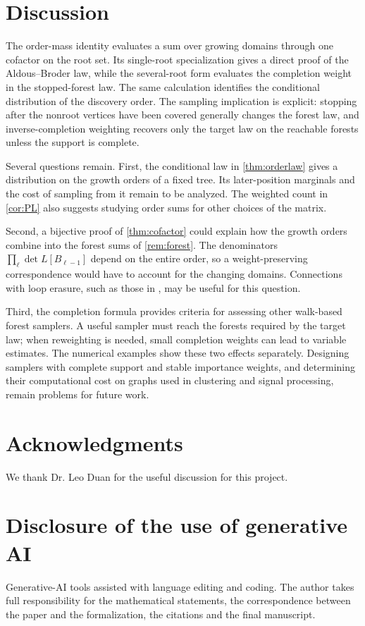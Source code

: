 \documentclass[onefignum,onetabnum]{siamart250211}
\numberwithin{theorem}{section}
\numberwithin{equation}{section}
\begin{document}
\section{Discussion}\label{sec:discussion}

The order-mass identity evaluates a sum over growing domains through
one cofactor on the root set. Its single-root specialization gives a
direct proof of the Aldous--Broder law, while the several-root form
evaluates the completion weight in the stopped-forest law. The same
calculation identifies the conditional distribution of the discovery
order. The sampling implication is explicit: stopping after the
nonroot vertices have been covered generally changes the forest law,
and inverse-completion weighting recovers only the target law on the
reachable forests unless the support is complete.

Several questions remain. First, the conditional law in
\cref{thm:orderlaw} gives a distribution on the growth orders of a
fixed tree. Its later-position marginals and the cost of sampling
from it remain to be analyzed. The weighted count in \cref{cor:PL}
also suggests studying order sums for other choices of the matrix.

Second, a bijective proof of \cref{thm:cofactor} could explain how
the growth orders combine into the forest sums of \cref{rem:forest}.
The denominators $\prod_\ell\det L[B_{\ell-1}]$ depend on the entire
order, so a weight-preserving correspondence would have to account
for the changing domains. Connections with loop erasure, such as
those in \cite{Fomin2001}, may be useful for this question.

Third, the completion formula provides criteria for assessing other
walk-based forest samplers. A useful sampler must reach the forests
required by the target law; when reweighting is needed, small
completion weights can lead to variable estimates. The numerical
examples show these two effects separately. Designing samplers with
complete support and stable importance weights, and determining
their computational cost on graphs used in clustering and signal
processing, remain problems for future work.


\section*{Acknowledgments}
We thank Dr. Leo Duan for the useful discussion for this project.

\section*{Disclosure of the use of generative AI}
Generative-AI tools assisted with language editing and coding. The author takes full
responsibility for the mathematical statements, the correspondence
between the paper and the formalization, the citations and the final
manuscript.
\end{document}
